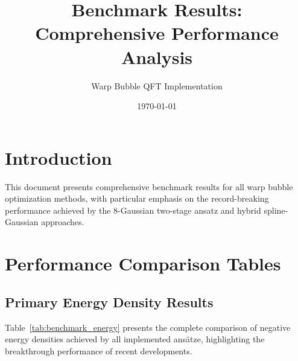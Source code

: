 \documentclass[12pt]{article}
\title{Benchmark Results: Comprehensive Performance Analysis}
\author{Warp Bubble QFT Implementation}
\date{\today}
\begin{document}
\maketitle

\section{Introduction}

This document presents comprehensive benchmark results for all warp bubble optimization methods, with particular emphasis on the record-breaking performance achieved by the 8-Gaussian two-stage ansatz and hybrid spline-Gaussian approaches.

\section{Performance Comparison Tables}

\subsection{Primary Energy Density Results}

Table~\ref{tab:benchmark_energy} presents the complete comparison of negative energy densities achieved by all implemented ansätze, highlighting the breakthrough performance of recent developments.
\end{document}
